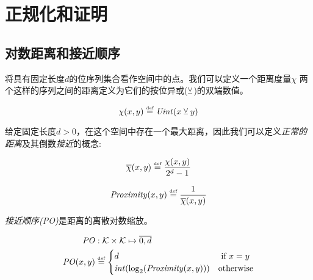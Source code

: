 
\chapter{正规化和证明}\label{sec:formalisation}

\section{对数距离和接近顺序\statusgreen}\label{sec:proximity}
将具有固定长度$d$的位序列集合看作空间中的点。我们可以定义一个距离度量$\chi$
两个这样的序列之间的距离定义为它们的按位异或($\veebar$)的双端数值。

\begin{definition}\label{def:xor}
\begin{equation}
\chi(x, y) \overset{\textrm{\tiny def}}{=} \mathit{Uint}(x  \veebar y)
\end{equation}
\end{definition}

给定固定长度$d>0$，在这个空间中存在一个最大距离，因此我们可以定义\emph{正常的距离}及其倒数\emph{接近}的概念:

\begin{definition}\label{def:normalisedxor}
\begin{equation}
\overline{\chi}(x, y) \overset{\textrm{\tiny def}}{=} \frac{\chi(x,y)}{2^d-1}
\end{equation}
\end{definition}

\begin{definition}[proximity]\label{def:proximity}
\begin{equation}
\mathit{Proximity}(x, y) \overset{\textrm{\tiny def}}{=} \frac{1}{\overline{\chi}(x,y)}
\end{equation}{}
\end{definition}


\emph{接近顺序(PO)}是距离的离散对数缩放。


\begin{definition}\label{def:xorPO}
\begin{equation}
\begin{split}
\mathit{PO}&: \mathcal{K} \times\mathcal{K}\mapsto \overline{0,d}\\
\mathit{PO}(x,y) &\overset{\textrm{\tiny def}}{=} 
\begin{cases}
d & \text{ if } x=y\\
\mathit{int}(\log_2(\mathit{Proximity}(x, y)))&\text{otherwise}\\
\end{cases}
\end{split}
\end{equation}
\end{definition}


